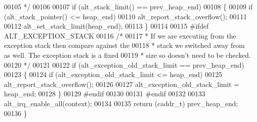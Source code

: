 \begin{DoxyCode}
00105 \textcolor{comment}{   */}
00106 
00107   \textcolor{keywordflow}{if} (alt_stack_limit() == prev\_heap\_end)
00108   \{
00109     \textcolor{keywordflow}{if} (alt_stack_pointer() <= heap_end)
00110       alt_report_stack_overflow();
00111 
00112     alt_set_stack_limit(heap_end);
00113   \}
00114 
00115 \textcolor{preprocessor}{#ifdef ALT\_EXCEPTION\_STACK}
00116   \textcolor{comment}{/*}
00117 \textcolor{comment}{   * If we are executing from the exception stack then compare against the}
00118 \textcolor{comment}{   * stack we switched away from as well.  The exception stack is a fixed}
00119 \textcolor{comment}{   * size so doesn't need to be checked.}
00120 \textcolor{comment}{   */}
00121 
00122   \textcolor{keywordflow}{if} (alt\_exception\_old\_stack\_limit == prev\_heap\_end)
00123   \{
00124     \textcolor{keywordflow}{if} (alt\_exception\_old\_stack\_limit <= heap_end)
00125       alt_report_stack_overflow();
00126 
00127     alt\_exception\_old\_stack\_limit = heap_end;
00128   \}
00129 \textcolor{preprocessor}{#endif}
00130 
00131 \textcolor{preprocessor}{#endif}
00132 
00133   alt_irq_enable_all(context);
00134 
00135   \textcolor{keywordflow}{return} (caddr\_t) prev\_heap\_end; 
00136 \} 
\end{DoxyCode}
